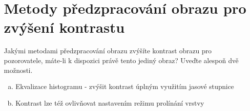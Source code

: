 \section{Metody předzpracování obrazu pro zvýšení kontrastu}
Jakými metodami předzpracování obrazu zvýšíte kontrast obrazu pro pozorovatele, máte-li k dispozici právě tento 
jediný obraz? Uveďte alespoň dvě možnosti.
\begin{enumerate}[a)]
    \item Ekvalizace histogramu - zvýšit kontrast úplným využitím jasové stupnice
    \item Kontrast lze též ovlivňovat nastavením režimu prolínání vrstvy
\end{enumerate}
